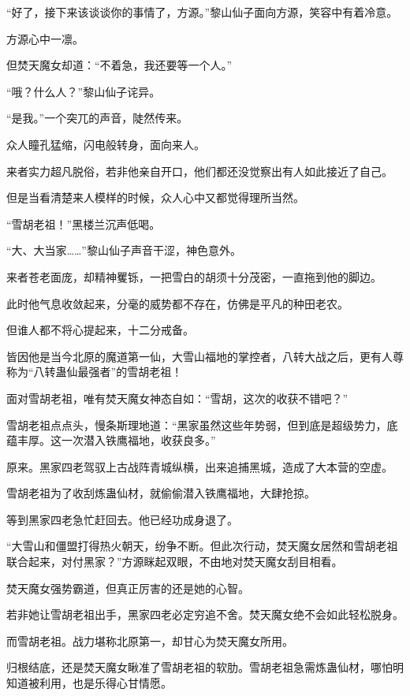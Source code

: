 
\begin{this_body}

“好了，接下来该谈谈你的事情了，方源。”黎山仙子面向方源，笑容中有着冷意。

方源心中一凛。

但焚天魔女却道：“不着急，我还要等一个人。”

“哦？什么人？”黎山仙子诧异。

“是我。”一个突兀的声音，陡然传来。

众人瞳孔猛缩，闪电般转身，面向来人。

来者实力超凡脱俗，若非他亲自开口，他们都还没觉察出有人如此接近了自己。

但是当看清楚来人模样的时候，众人心中又都觉得理所当然。

“雪胡老祖！”黑楼兰沉声低喝。

“大、大当家……”黎山仙子声音干涩，神色意外。

来者苍老面庞，却精神矍铄，一把雪白的胡须十分茂密，一直拖到他的脚边。

此时他气息收敛起来，分毫的威势都不存在，仿佛是平凡的种田老农。

但谁人都不将心提起来，十二分戒备。

皆因他是当今北原的魔道第一仙，大雪山福地的掌控者，八转大战之后，更有人尊称为“八转蛊仙最强者”的雪胡老祖！

面对雪胡老祖，唯有焚天魔女神态自如：“雪胡，这次的收获不错吧？”

雪胡老祖点点头，慢条斯理地道：“黑家虽然这些年势弱，但到底是超级势力，底蕴丰厚。这一次潜入铁鹰福地，收获良多。”

原来。黑家四老驾驭上古战阵青城纵横，出来追捕黑城，造成了大本营的空虚。

雪胡老祖为了收刮炼蛊仙材，就偷偷潜入铁鹰福地，大肆抢掠。

等到黑家四老急忙赶回去。他已经功成身退了。

“大雪山和僵盟打得热火朝天，纷争不断。但此次行动，焚天魔女居然和雪胡老祖联合起来，对付黑家？”方源眯起双眼，不由地对焚天魔女刮目相看。

焚天魔女强势霸道，但真正厉害的还是她的心智。

若非她让雪胡老祖出手，黑家四老必定穷追不舍。焚天魔女绝不会如此轻松脱身。

而雪胡老祖。战力堪称北原第一，却甘心为焚天魔女所用。

归根结底，还是焚天魔女瞅准了雪胡老祖的软肋。雪胡老祖急需炼蛊仙材，哪怕明知道被利用，也是乐得心甘情愿。


\end{this_body}

